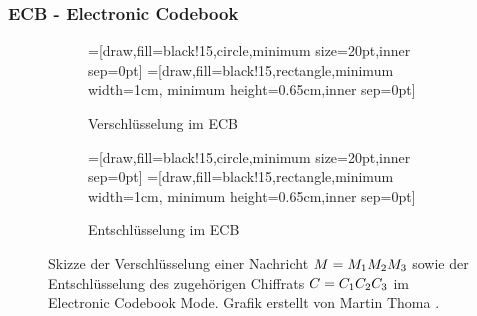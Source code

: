 \subsubsection{ECB - Electronic Codebook}
\begin{figure}[h]
	\centering
	\begin{subfigure}[h]{.45\textwidth}
		\centering
		=[draw,fill=black!15,circle,minimum size=20pt,inner sep=0pt]
		=[draw,fill=black!15,rectangle,minimum width=1cm, minimum height=0.65cm,inner sep=0pt]
		\caption{Verschlüsselung im ECB}
	\end{subfigure}
	\hfill
	\begin{subfigure}[h]{.45\textwidth}
		\centering
		=[draw,fill=black!15,circle,minimum size=20pt,inner sep=0pt]
		=[draw,fill=black!15,rectangle,minimum width=1cm, minimum height=0.65cm,inner sep=0pt]
		\caption{Entschlüsselung im ECB}
	\end{subfigure}
	\caption{Skizze der Verschlüsselung einer Nachricht $M = M_1 M_2 M_3$ sowie der Entschlüsselung des zugehörigen Chiffrats $C = C_1 C_2 C_3$ im
	Electronic Codebook Mode. Grafik erstellt von Martin Thoma \cite{Thoma2013}.}
\end{figure}

